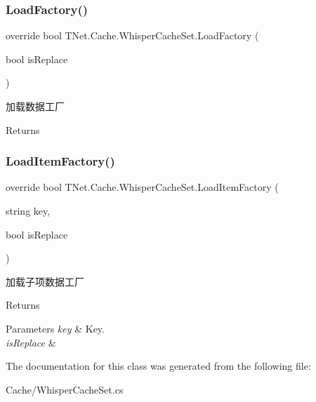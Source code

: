 \subsubsection{\texorpdfstring{Load\+Factory()}{LoadFactory()}}
{\footnotesize\ttfamily override bool T\+Net.\+Cache.\+Whisper\+Cache\+Set.\+Load\+Factory (\begin{DoxyParamCaption}\item[{bool}]{is\+Replace }\end{DoxyParamCaption})\hspace{0.3cm}{\ttfamily [protected]}}



加载数据工厂 

\begin{DoxyReturn}{Returns}

\end{DoxyReturn}
\mbox{\label{class_t_net_1_1_cache_1_1_whisper_cache_set_a298782e3470d365db9b032778a874590}} 
\subsubsection{\texorpdfstring{Load\+Item\+Factory()}{LoadItemFactory()}}
{\footnotesize\ttfamily override bool T\+Net.\+Cache.\+Whisper\+Cache\+Set.\+Load\+Item\+Factory (\begin{DoxyParamCaption}\item[{string}]{key,  }\item[{bool}]{is\+Replace }\end{DoxyParamCaption})\hspace{0.3cm}{\ttfamily [protected]}}



加载子项数据工厂 

\begin{DoxyReturn}{Returns}

\end{DoxyReturn}

\begin{DoxyParams}{Parameters}
{\em key} & Key.\\
\hline
{\em is\+Replace} & \\
\hline
\end{DoxyParams}


The documentation for this class was generated from the following file\+:\begin{DoxyCompactItemize}
\item 
Cache/Whisper\+Cache\+Set.\+cs\end{DoxyCompactItemize}
